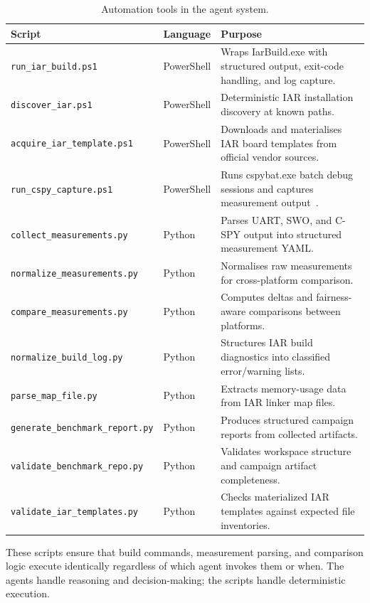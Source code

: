 \begin{table}[H]
\centering
\caption{Automation tools in the agent system.}
\label{tab:agent-automation-tools}
\begin{tabularx}{\textwidth}{l l X}
\toprule
\textbf{Script} & \textbf{Language} & \textbf{Purpose} \\
\midrule
\texttt{run\_iar\_build.ps1} & PowerShell & Wraps IarBuild.exe with structured output, exit-code handling, and log capture. \\
\texttt{discover\_iar.ps1} & PowerShell & Deterministic IAR installation discovery at known paths. \\
\texttt{acquire\_iar\_template.ps1} & PowerShell & Downloads and materialises IAR board templates from official vendor sources. \\
\texttt{run\_cspy\_capture.ps1} & PowerShell & Runs cspybat.exe batch debug sessions and captures measurement output~\cite{iar-cspybat}. \\
\texttt{collect\_measurements.py} & Python & Parses UART, SWO, and C-SPY output into structured measurement YAML. \\
\texttt{normalize\_measurements.py} & Python & Normalises raw measurements for cross-platform comparison. \\
\texttt{compare\_measurements.py} & Python & Computes deltas and fairness-aware comparisons between platforms. \\
\texttt{normalize\_build\_log.py} & Python & Structures IAR build diagnostics into classified error/warning lists. \\
\texttt{parse\_map\_file.py} & Python & Extracts memory-usage data from IAR linker map files. \\
\texttt{generate\_benchmark\_report.py} & Python & Produces structured campaign reports from collected artifacts. \\
\texttt{validate\_benchmark\_repo.py} & Python & Validates workspace structure and campaign artifact completeness. \\
\texttt{validate\_iar\_templates.py} & Python & Checks materialized IAR templates against expected file inventories. \\
\bottomrule
\end{tabularx}
\end{table}

These scripts ensure that build commands, measurement parsing, and comparison logic execute
identically regardless of which agent invokes them or when. The agents handle reasoning and
decision-making; the scripts handle deterministic execution.

